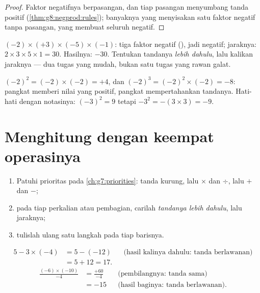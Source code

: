 \begin{proof}
Faktor negatifnya berpasangan, dan tiap pasangan menyumbang tanda
positif (\cref{thm:g8:negprod:rules}); banyaknya yang 
menyisakan satu faktor negatif tanpa pasangan, yang membuat seluruh
 negatif.
\end{proof}

\begin{example}\label{ex:g8:negprod:many}
$(-2) \times (+3) \times (-5) \times (-1)$: tiga faktor negatif
(), jadi  negatif; jaraknya: $2 \times 3 \times 5
\times 1 = 30$. Hasilnya: $-30$. Tentukan tandanya \emph{lebih
dahulu}, lalu kalikan jaraknya --- dua tugas yang mudah, bukan satu
tugas yang rawan galat.
\end{example}

\begin{example}\label{ex:g8:negprod:powers}
$(-2)^2 = (-2) \times (-2) = +4$, dan
$(-2)^3 = (-2)^2 \times (-2) = -8$: pangkat  memberi nilai yang
positif, pangkat  mempertahankan tandanya. Hati-hati dengan
notasinya: $(-3)^2 = 9$ tetapi $-3^2 = -(3 \times 3) = -9$.
\end{example}

\section{Menghitung dengan keempat operasinya}

\begin{method}\label{met:g8:negprod:compute}
\begin{enumerate}
  \item Patuhi prioritas pada \cref{ch:g7:priorities}: tanda kurung,
        lalu $\times$ dan $\div$, lalu $+$ dan $-$;
  \item pada tiap perkalian atau pembagian, carilah \emph{tandanya
        lebih dahulu}, lalu jaraknya;
  \item tulislah ulang satu langkah pada tiap barisnya.
\end{enumerate}
\end{method}

\begin{example}\label{ex:g8:negprod:compute}
\begin{align*}
5 - 3 \times (-4)
&= 5 - (-12) && \text{(hasil kalinya dahulu: tanda berlawanan)}\\
&= 5 + 12 = 17 .
\end{align*}
\begin{align*}
\frac{(-6) \times (-10)}{-4}
&= \frac{+60}{-4} && \text{(pembilangnya: tanda sama)}\\
&= -15 && \text{(hasil baginya: tanda berlawanan).}
\end{align*}
\end{example}

